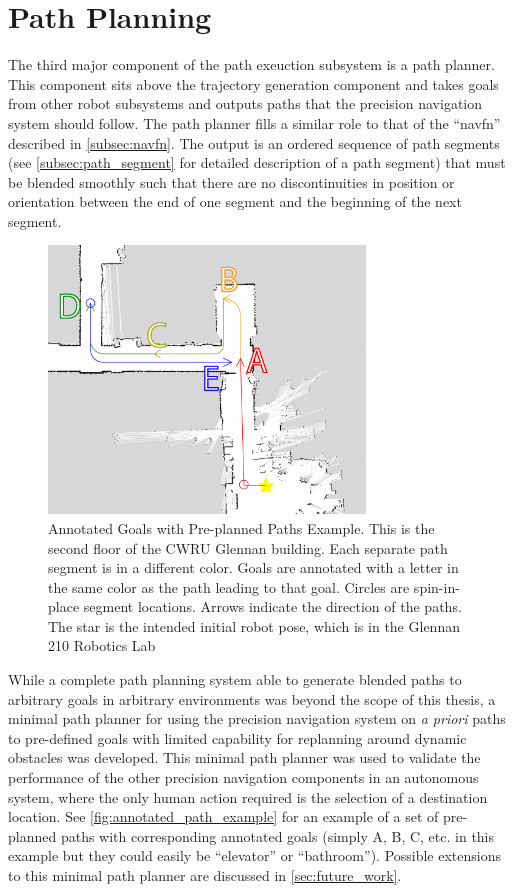 \section{Path Planning}\label{sec:path_planning}

The third major component of the path exeuction subsystem is a path planner. This component sits above the trajectory generation component and takes goals from other robot subsystems and outputs paths that the precision navigation system should follow. The path planner fills a similar role to that of the ``navfn'' described in \autoref{subsec:navfn}. The output is an ordered sequence of path segments (see \autoref{subsec:path_segment} for detailed description of a path segment) that must be blended smoothly such that there are no discontinuities in position or orientation between the end of one segment and the beginning of the next segment.

\begin{figure}
\centering
\includegraphics[width=0.75\textwidth]{images/2nd_floor_one_door_cropped_annotated}
\caption[Annotated Goals with Pre-planned Paths Example]{Annotated Goals with Pre-planned Paths Example. This is the second floor of the CWRU Glennan building. Each separate path segment is in a different color. Goals are annotated with a letter in the same color as the path leading to that goal. Circles are spin-in-place segment locations. Arrows indicate the direction of the paths. The star is the intended initial robot pose, which is in the Glennan 210 Robotics Lab \label{fig:annotated_path_example}}
\end{figure}

While a complete path planning system able to generate blended paths to arbitrary goals in arbitrary environments was beyond the scope of this thesis, a minimal path planner for using the precision navigation system on \emph{a priori} paths to pre-defined goals with limited capability for replanning around dynamic obstacles was developed. This minimal path planner was used to validate the performance of the other precision navigation components in an autonomous system, where the only human action required is the selection of a destination location. See \autoref{fig:annotated_path_example} for an example of a set of pre-planned paths with corresponding annotated goals (simply A, B, C, etc. in this example but they could easily be ``elevator'' or ``bathroom''). Possible extensions to this minimal path planner are discussed in \autoref{sec:future_work}.

